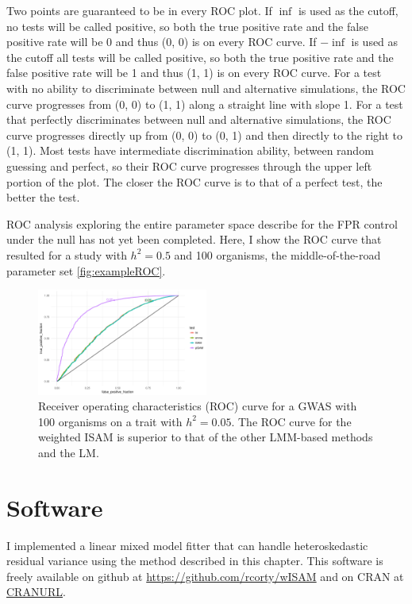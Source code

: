 Two points are guaranteed to be in every ROC plot.
If $\inf$ is used as the cutoff, no tests will be called positive, so both the true positive rate and the false positive rate will be 0 and thus (0, 0) is on every ROC curve.
If $-\inf$ is used as the cutoff all tests will be called positive, so both the true positive rate and the false positive rate will be 1 and thus (1, 1) is on every ROC curve.
For a test with no ability to discriminate between null and alternative simulations, the ROC curve progresses from (0, 0) to (1, 1) along a straight line with slope 1.
For a test that perfectly discriminates between null and alternative simulations, the ROC curve progresses directly up from (0, 0) to (0, 1) and then directly to the right to (1, 1).
Most tests have intermediate discrimination ability, between random guessing and perfect, so their ROC curve progresses through the upper left portion of the plot.
The closer the ROC curve is to that of a perfect test, the better the test.

ROC analysis exploring the entire parameter space describe for the FPR control under the null has not yet been completed.
Here, I show the ROC curve that resulted for a study with $h^2 = 0.5$ and 100 organisms, the middle-of-the-road parameter set \autoref{fig:exampleROC}.
\begin{figure}
  \centering
  \includegraphics[width = 0.5\textwidth]{images/roc_hetsked_100snps_1ksims_05h2_100strains.pdf}
  \caption[
    Receiver operating characteristics (ROC) curve for a GWAS with 100 organisms on a trait with $h^2 = 0.05$.
  ]
  {
    Receiver operating characteristics (ROC) curve for a GWAS with 100 organisms on a trait with $h^2 = 0.05$.
    The ROC curve for the weighted ISAM is superior to that of the other LMM-based methods and the LM.
  }
  \label{fig:exampleROC}
\end{figure}


\section{Software}

I implemented a linear mixed model fitter that can handle heteroskedastic residual variance using the method described in this chapter.
This software is freely available on github at \url{https://github.com/rcorty/wISAM} and on CRAN at \url{CRANURL}.